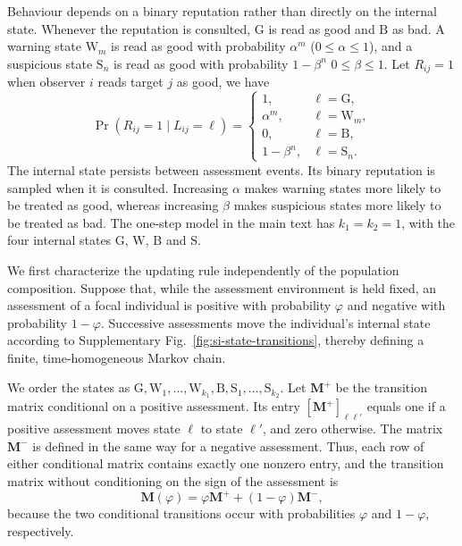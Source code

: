 \documentclass[fleqn,10pt]{wlscirep}
\begin{document}
Behaviour depends on a binary reputation rather than directly on the internal state. Whenever the reputation is consulted, $\mathrm{G}$ is read as good and $\mathrm{B}$ as bad. A warning state $\mathrm{W}_m$ is read as good with probability $\alpha^m$ ($0\leq \alpha \leq 1$), and a suspicious state $\mathrm{S}_n$ is read as good with probability $1-\beta^n$ $0\leq \beta \leq 1$. Let $R_{ij}=1$ when observer $i$ reads target $j$ as good, we have
\begin{equation}
\Pr(R_{ij}=1\mid L_{ij}=\ell)=
\begin{cases}
1, & \ell=\mathrm{G},\\
\alpha^m, & \ell=\mathrm{W}_m,\\
0, & \ell=\mathrm{B},\\
1-\beta^n, & \ell=\mathrm{S}_n.
\end{cases}
\label{eq:si-binary-readout}
\end{equation}
The internal state persists between assessment events. Its binary reputation is sampled when it is consulted. Increasing $\alpha$ makes warning states more likely to be treated as good, whereas increasing $\beta$ makes suspicious states more likely to be treated as bad. The one-step model in the main text has $k_1=k_2=1$, with the four internal states $\mathrm{G}$, $\mathrm{W}$, $\mathrm{B}$ and $\mathrm{S}$.

We first characterize the updating rule independently of the population composition. Suppose that, while the assessment environment is held fixed, an assessment of a focal individual is positive with probability $\varphi$ and negative with probability $1-\varphi$. Successive assessments move the individual's internal state according to Supplementary Fig.~\ref{fig:si-state-transitions}, thereby defining a finite, time-homogeneous Markov chain.

We order the states as $\mathrm{G},\mathrm{W}_1,\ldots,\mathrm{W}_{k_1},\mathrm{B},\mathrm{S}_1,\ldots,\mathrm{S}_{k_2}$. Let $\mathbf M^+$ be the transition matrix conditional on a positive assessment. Its entry $[\mathbf M^+]_{\ell\ell'}$ equals one if a positive assessment moves state $\ell$ to state $\ell'$, and zero otherwise. The matrix $\mathbf M^-$ is defined in the same way for a negative assessment. Thus, each row of either conditional matrix contains exactly one nonzero entry, and the transition matrix without conditioning on the sign of the assessment is
\begin{equation}
\mathbf M(\varphi)=\varphi\mathbf M^+ +(1-\varphi)\mathbf M^-,
\label{eq:si-markov-matrix}
\end{equation}
because the two conditional transitions occur with probabilities $\varphi$ and $1-\varphi$, respectively.
\end{document}
